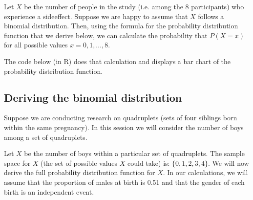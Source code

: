 \documentclass[letterpaper,10pt,english]{jupyterBook}
\begin{document}
\sphinxAtStartPar
Let \(X\) be the number of people in the study (i.e. among the 8 participants) who experience a side\sphinxhyphen{}effect. Suppose we are happy to assume that \(X\) follows a binomial distribution. Then, using the formula for the probability distribution function that we derive below, we can calculate the probability that \(P(X=x)\) for all possible values \(x=0,1,...,8\).

\sphinxAtStartPar
The code below (in R) does that calculation and displays a bar chart of the probability distribution function.

\begin{sphinxVerbatim}[commandchars=\\\{\}]
  
  
    

 
 
\end{sphinxVerbatim}

\noindent{}


\subsection{Deriving the binomial distribution}
\label{\detokenize{02.c. Probability.Discrete:deriving-the-binomial-distribution}}
\sphinxAtStartPar
Suppose we are conducting research on quadruplets (sets of four siblings born within the same pregnancy). In this session we will consider the number of boys among a set of quadruplets.

\sphinxAtStartPar
Let \(X\) be the number of boys within a particular set of quadruplets. The sample space for \(X\) (the set of possible values \(X\) could take) is: \(\{0, 1, 2, 3, 4 \}\). We will now derive the full probability distribution function for \(X\).  In our calculations, we will assume that the proportion of males at birth is 0.51 and that the gender of each birth is an independent event.
\end{document}
